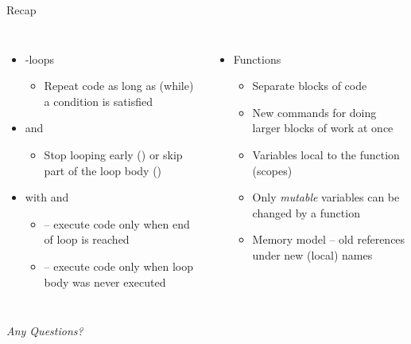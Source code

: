 
\begin{frame}[t,plain]
\titlepage
\end{frame}


\begin{frame}{Recap}
%
\begin{columns}[T]
\begin{itemize}
\item {}-loops
	\begin{itemize}
	\item Repeat code as long as (while) a condition is satisfied
	\end{itemize}
\item {} and 
	\begin{itemize}
	\item Stop looping early () or skip part of the loop body ()
	\end{itemize}
\item {} with  and 
	\begin{itemize}
	\item {}   -- execute code only when end of loop is reached
	\item {} -- execute code only when loop body was never executed
	\end{itemize}
\end{itemize}
%
\begin{itemize}
\item Functions
	\begin{itemize}
	\item Separate blocks of code
	\item New commands for doing larger blocks of work at once
	\item Variables local to the function (\thus scopes)
	\item Only \emph{mutable} variables can be changed by a function
	\item Memory model -- old references under new (local) names
	\end{itemize}
\end{itemize}

\end{columns}
%
\begin{center}
	\emph{Any Questions?}
\end{center}
%
\end{frame}

